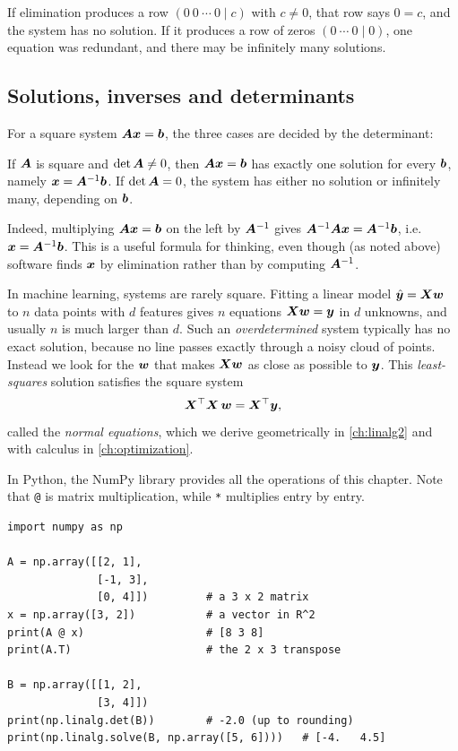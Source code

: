 If elimination produces a row $(0\ 0\ \cdots\ 0 \mid c)$ with $c \neq 0$, that
row says $0 = c$, and the system has no solution. If it produces a row of
zeros $(0\ \cdots\ 0 \mid 0)$, one equation was redundant, and there may be
infinitely many solutions.

\subsection{Solutions, inverses and determinants}

For a square system $\bm{A}\bm{x} = \bm{b}$, the three cases are decided by the
determinant:

\begin{theorem}\label{thm:square-systems}
If $\bm{A}$ is square and $\det\bm{A} \neq 0$, then $\bm{A}\bm{x} = \bm{b}$ has exactly one
solution for every $\bm{b}$, namely $\bm{x} = \bm{A}^{-1}\bm{b}$. If $\det\bm{A} = 0$, the
system has either no solution or infinitely many, depending on $\bm{b}$.
\end{theorem}

Indeed, multiplying $\bm{A}\bm{x} = \bm{b}$ on the left by $\bm{A}^{-1}$ gives
$\bm{A}^{-1}\bm{A}\bm{x} = \bm{A}^{-1}\bm{b}$, i.e.\ $\bm{x} = \bm{A}^{-1}\bm{b}$. This is a useful
formula for thinking, even though (as noted above) software finds $\bm{x}$ by
elimination rather than by computing $\bm{A}^{-1}$.

\begin{mlnote}
In machine learning, systems are rarely square. Fitting a linear model
$\hat{\bm{y}} = \bm{X}\bm{w}$ to $n$ data points with $d$ features gives $n$ equations
$\bm{X}\bm{w} = \bm{y}$ in $d$ unknowns, and usually $n$ is much larger than $d$. Such
an \emph{overdetermined} system typically has no exact solution, because no
line passes exactly through a noisy cloud of points. Instead we look for the
$\bm{w}$ that makes $\bm{X}\bm{w}$ as close as possible to $\bm{y}$. This
\emph{least-squares} solution satisfies the square system
\[
  \bm{X}^\top\bm{X}\,\bm{w} = \bm{X}^\top\bm{y} ,
\]
called the \emph{normal equations}, which we derive geometrically in
\cref{ch:linalg2} and with calculus in \cref{ch:optimization}.
\end{mlnote}

\begin{remark}
In Python, the NumPy library provides all the operations of this chapter. Note
that \texttt{@} is matrix multiplication, while \texttt{*} multiplies entry by
entry.
\par\noindent\begin{minipage}{\linewidth}
\begin{lstlisting}
import numpy as np

A = np.array([[2, 1],
              [-1, 3],
              [0, 4]])         # a 3 x 2 matrix
x = np.array([3, 2])           # a vector in R^2
print(A @ x)                   # [8 3 8]
print(A.T)                     # the 2 x 3 transpose

B = np.array([[1, 2],
              [3, 4]])
print(np.linalg.det(B))        # -2.0 (up to rounding)
print(np.linalg.solve(B, np.array([5, 6])))   # [-4.   4.5]
\end{lstlisting}
\end{minipage}
\end{remark}

